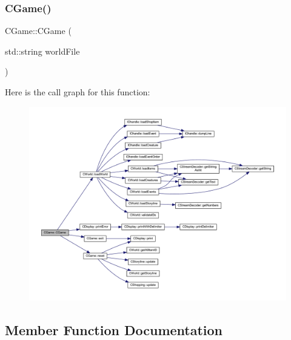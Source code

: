 \mbox{\label{class_c_game_af5435e79a93dd92991ae24b499976470}} 
\subsubsection{\texorpdfstring{C\+Game()}{CGame()}\hspace{0.1cm}{\footnotesize\ttfamily [2/2]}}
{\footnotesize\ttfamily C\+Game\+::\+C\+Game (\begin{DoxyParamCaption}\item[{std\+::string}]{world\+File }\end{DoxyParamCaption})\hspace{0.3cm}{\ttfamily [explicit]}}

Here is the call graph for this function\+:\nopagebreak
\begin{figure}[H]
\begin{center}
\leavevmode
\includegraphics[width=350pt]{class_c_game_af5435e79a93dd92991ae24b499976470_cgraph}
\end{center}
\end{figure}


\subsection{Member Function Documentation}
\mbox{\label{class_c_game_ac0a8028013ca5a7c135c29fa582df4a0}} 
